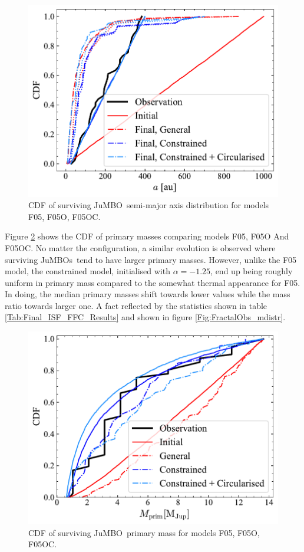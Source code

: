 \documentclass[aa]{lib/aa}
\newcommand{\jumbo}{\mbox{JuMBO}}
\newcommand{\jumbos}{\mbox{JuMBOs}}
\begin{document}
   \begin{figure}
    \centering
        \includegraphics[width=\columnwidth]{figures/Fractal_noFF_sem_axis.pdf}
        \caption{CDF of surviving \jumbo\, semi-major axis distribution for models F05, F05O, F05OC.}
         \label{Fig:Semi_Fractal}
   \end{figure}

   Figure \ref{Fig:Fractal_mdistrCDF} shows the CDF of primary masses comparing models F05, F05O And F05OC. No matter the configuration, a similar evolution is observed where surviving \jumbos\, tend to have larger primary masses. However, unlike the F05 model, the constrained model, initialised with $\alpha = -1.25$, end up being roughly uniform in primary mass compared to the somewhat thermal appearance for F05. In doing, the median primary masses shift towards lower values while the mass ratio towards larger one. A fact reflected by the statistics shown in table \ref{Tab:Final_ISF_FFC_Results} and shown in figure \ref{Fig:FractalObs_mdistr}.
    
   \begin{figure}
    \centering
        \includegraphics[width=\columnwidth]{figures/Fractal_noFF_mprim_vs_obs_.pdf}
        \caption{CDF of surviving \jumbo\, primary mass for models F05, F05O, F05OC.}
         \label{Fig:Fractal_mdistrCDF}
   \end{figure}
\end{document}
